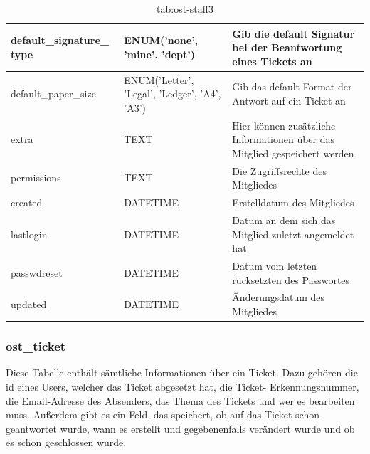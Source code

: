 \begin{table}[h]
	\begin{tabular}{|p{3.5cm}|p{4cm}|p{6.2cm}|}
		\hline
		default\_signature\_ type & ENUM('none', 'mine', 'dept') & Gib die default Signatur bei der Beantwortung eines Tickets an \\
		\hline
			
		default\_paper\_size & ENUM('Letter', 'Legal', 'Ledger', 'A4', 'A3') & Gib das default Format der Antwort auf ein Ticket an \\
		\hline
		extra & TEXT & Hier können zusätzliche Informationen über das Mitglied gespeichert werden \\
		\hline
		permissions & TEXT & Die Zugriffsrechte des Mitgliedes \\
		\hline
		created & DATETIME & Erstelldatum des Mitgliedes \\
		\hline
		lastlogin & DATETIME & Datum an dem sich das Mitglied zuletzt angemeldet hat \\
		\hline
		passwdreset & DATETIME & Datum vom letzten rücksetzten des Passwortes \\
		\hline
		updated & DATETIME & Änderungsdatum des Mitgliedes \\
		\hline
	\end{tabular}
	\caption{tab:ost-staff3}
\end{table}
\label{tab:ost_staff3}

\newpage

\subsubsection{ost\_ticket}

Diese Tabelle enthält sämtliche Informationen über ein Ticket. Dazu gehören die id eines Users, welcher das Ticket abgesetzt hat, die Ticket- Erkennungsnummer, die Email-Adresse des Absenders, das Thema des Tickets und wer es bearbeiten muss. Außerdem gibt es ein Feld, das speichert, ob auf das Ticket schon geantwortet wurde, wann es erstellt und gegebenenfalls verändert wurde und ob es schon geschlossen wurde.



